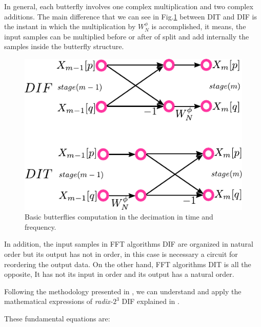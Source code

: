 \documentclass[journal,comsoc]{IEEEtran}
\begin{document}
In general, each butterfly involves one complex multiplication and two complex additions. The main difference that we can see in Fig.\ref{fig:difdit} between DIT and DIF is the instant in which the multiplication by $W_N^\phi$ is accomplished, it means, the input samples can be multiplied before or after of split and add internally the samples inside the butterfly structure.
\begin{figure}[h!]%
	\centering
	\includegraphics[width=0.65\linewidth]{Diagramas/miSeccionFiguras/DifDit.pdf}
	\caption{Basic butterflies computation in the decimation in time and frequency.}
	\label{fig:difdit}
\end{figure}

In addition, the input samples in FFT algorithms DIF are organized in natural order but its output has not in order, in this case is necessary a circuit for reordering the output data. On the other hand, FFT algorithms DIT is all the  opposite, It has not its input in order and its output has a natural order.

Following the methodology presented in \cite{proakis_digital_nodate}, we can understand and apply the mathematical expressions of \textit{radix-}$2^3$ DIF explained in \cite{jia_efficient_nodate}. 

These fundamental equations are:
\end{document}
